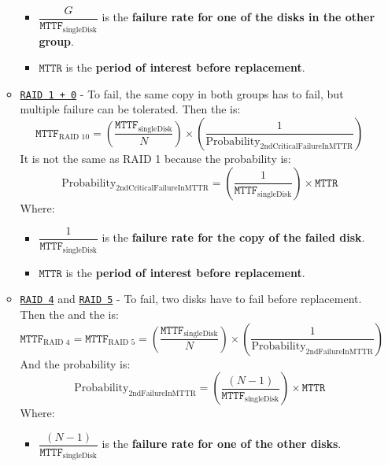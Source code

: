 \begin{itemize}
\begin{itemize}
\begin{itemize}
            \item $\dfrac{G}{\texttt{MTTF}_{\text{singleDisk}}}$ is the \textbf{failure rate for one of the disks in the other group}.
            
            \item $\texttt{MTTR}$ is the \textbf{period of interest before replacement}.
        \end{itemize}


        \item \texttt{\underline{RAID 1 + 0}} - To fail, the same copy in both groups has to fail, but multiple failure can be tolerated. Then the  is:
        \begin{equation}
            \texttt{MTTF}_{\text{RAID 10}} = \left(
                \dfrac{\texttt{MTTF}_{\text{singleDisk}}}{N}
            \right) \times \left(
                \dfrac{1}{\text{Probability}_{\text{2ndCriticalFailureInMTTR}}}
            \right)
        \end{equation}
        It is not the same as RAID 1 because the probability is:
        \begin{equation}
            \text{Probability}_{\text{2ndCriticalFailureInMTTR}} = \left(\dfrac{1}{\texttt{MTTF}_{\text{singleDisk}}}\right) \times \texttt{MTTR}
        \end{equation}
        Where:
        \begin{itemize}
            \item $\dfrac{1}{\texttt{MTTF}_{\text{singleDisk}}}$ is the \textbf{failure rate for the copy of the failed disk}.

            \item $\texttt{MTTR}$ is the \textbf{period of interest before replacement}.
        \end{itemize}


        \item \texttt{\underline{RAID 4}} and \texttt{\underline{RAID 5}} - To fail, two disks have to fail before replacement. Then the  and the  is:
        \begin{equation}
            \texttt{MTTF}_{\text{RAID 4}} = \texttt{MTTF}_{\text{RAID 5}} = \left(
                \dfrac{\texttt{MTTF}_{\text{singleDisk}}}{N}
            \right) \times \left(
                \dfrac{1}{\text{Probability}_{\text{2ndFailureInMTTR}}}
            \right)
        \end{equation}
        And the probability is:
        \begin{equation}
            \text{Probability}_{\text{2ndFailureInMTTR}} = \left(\dfrac{\left(N-1\right)}{\texttt{MTTF}_{\text{singleDisk}}}\right) \times \texttt{MTTR}
        \end{equation}
        Where:
        \begin{itemize}
            \item $\dfrac{\left(N-1\right)}{\texttt{MTTF}_{\text{singleDisk}}}$ is the \textbf{failure rate for one of the other disks}.


\end{itemize}
\end{itemize}
\end{itemize}
